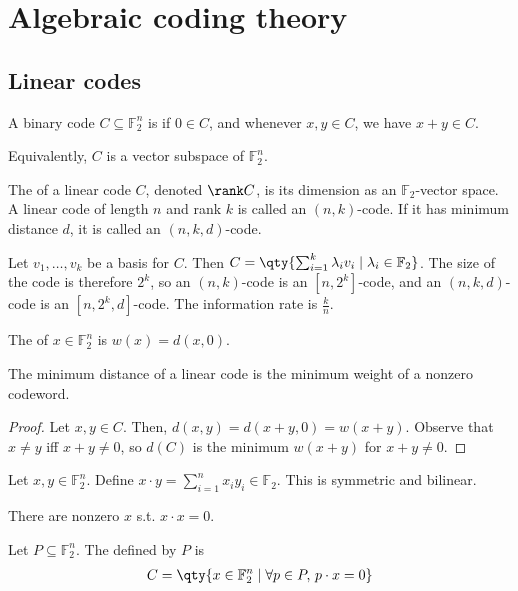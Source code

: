 \section{Algebraic coding theory}

\subsection{Linear codes}
\begin{definition}
    A binary code $C \subseteq \mathbb F_2^n$ is  if $0 \in C$, and whenever $x, y \in C$, we have $x + y \in C$.
\end{definition}
Equivalently, $C$ is a vector subspace of $\mathbb F_2^n$.
\begin{definition}
    The  of a linear code $C$, denoted $\rank C$, is its dimension as an $\mathbb F_2$-vector space.
    A linear code of length $n$ and rank $k$ is called an $(n,k)$-code.
    If it has minimum distance $d$, it is called an $(n,k,d)$-code.
\end{definition}
Let $v_1, \dots, v_k$ be a basis for $C$.
Then $C = \qty{\sum_{i=1}^k \lambda_i v_i \mid \lambda_i \in \mathbb F_2}$.
The size of the code is therefore $2^k$, so an $(n,k)$-code is an $[n,2^k]$-code, and an $(n,k,d)$-code is an $[n,2^k,d]$-code.
The information rate is $\frac{k}{n}$.
\begin{definition}
    The  of $x \in \mathbb F_2^n$ is $w(x) = d(x,0)$.
\end{definition}
\begin{lemma}
    The minimum distance of a linear code is the minimum weight of a nonzero codeword.
\end{lemma}
\begin{proof}
    Let $x, y \in C$.
    Then, $d(x,y) = d(x+y,0) = w(x+y)$.
    Observe that $x \neq y$ iff $x + y \neq 0$, so $d(C)$ is the minimum $w(x+y)$ for $x + y \neq 0$.
\end{proof}
\begin{definition}
    Let $x, y \in \mathbb F_2^n$.
    Define $x \cdot y = \sum_{i=1}^n x_i y_i \in \mathbb F_2$.
    This is symmetric and bilinear.
\end{definition}
There are nonzero $x$ s.t. $x \cdot x = 0$.
\begin{definition}
    Let $P \subseteq \mathbb F_2^n$.
    The  defined by $P$ is
    \begin{align*}
        C = \qty{x \in \mathbb F_2^n \mid \forall p \in P,\,p \cdot x = 0}
    \end{align*}
\end{definition}
